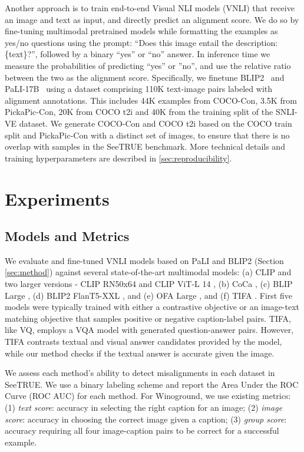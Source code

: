 \documentclass{article}
\newcommand{\datasetname}[0]{SeeTRUE\xspace}
\newcommand{\VQSQR}[0]{VQ\xspace}
\begin{document}
Another approach is to train end-to-end Visual NLI models (VNLI) that receive an image and text as input, and directly predict an alignment score. We do so by fine-tuning multimodal pretrained models while formatting the examples as yes/no questions using the prompt: ``Does this image entail the description: \{text\}?'', followed by a binary ``yes'' or ``no'' answer. In inference time we measure the probabilities of predicting ``yes'' or ''no'', and use the relative ratio between the two as the alignment score. Specifically, we finetune BLIP2~\cite{li2023blip} and PaLI-17B~\cite{pali2} using a dataset comprising 110K text-image pairs labeled with alignment annotations. This includes 44K examples from COCO-Con, 3.5K from PickaPic-Con, 20K from COCO t2i and 40K from the training split of the SNLI-VE dataset. We generate COCO-Con and COCO t2i based on the COCO train split and PickaPic-Con with a distinct set of images, to ensure that there is no overlap with samples in the \datasetname benchmark. More technical details and training hyperparameters are described in \cref{sec:reproducibility}. 
 
\section{Experiments}
\label{sec:visual_entailment}


\subsection{Models and Metrics}

We evaluate  and fine-tuned VNLI models based on PaLI and BLIP2 (Section \ref{sec:method}) against several state-of-the-art multimodal models: (a) CLIP \citep{radford2021learning} and two larger versions - CLIP RN50x64 and CLIP ViT-L 14 \citep{dosovitskiy2020image}, (b) CoCa \citep{yu2022coca}, (c) BLIP Large \citep{li2022blip}, (d) BLIP2 FlanT5-XXL \citep{li2023blip}, and (e) OFA Large \citep{wang2022ofa}, and (f) TIFA \citep{hu2023tifa}. First five models were typically trained with either a contrastive objective or an image-text matching objective that samples positive or negative caption-label pairs. TIFA, like \VQSQR, employs a VQA model with generated question-answer pairs. However, TIFA contrasts textual and visual answer candidates provided by the model, while our method checks if the textual answer is accurate given the image.

We assess each method's ability to detect misalignments in each dataset in \datasetname. We use a binary labeling scheme and report the Area Under the ROC Curve (ROC AUC) for each method. For Winoground, we use existing metrics: (1) \textit{text score}: accuracy in selecting the right caption for an image; (2) \textit{image score}: accuracy in choosing the correct image given a caption; (3) \textit{group score}: accuracy requiring all four image-caption pairs to be correct for a successful example.
\end{document}
